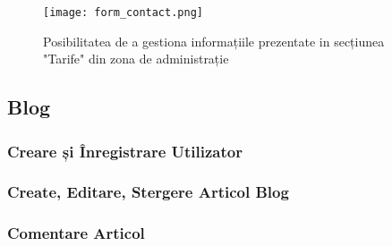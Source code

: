 \documentclass[11pt]{scrartcl} %
\begin{document}
\begin{figure}[h] %
	\centering
	\texttt{[image: form\_contact.png]} %
	\caption{Posibilitatea de a gestiona informațiile prezentate in secțiunea "Tarife" din zona de administrație}
	\label{fig:form_contact}
\end{figure}




\subsection{Blog}


\subsubsection{Creare și Înregistrare Utilizator}


\subsubsection{Create, Editare, Stergere Articol Blog}


\subsubsection{Comentare Articol}

\end{document}

